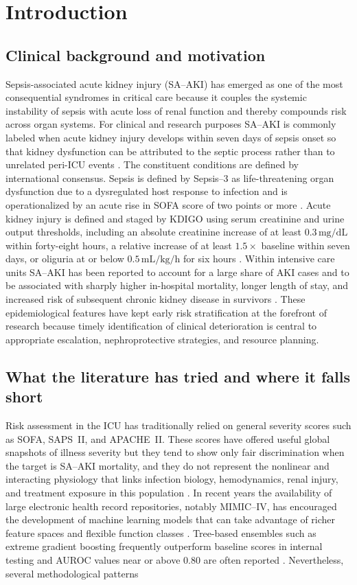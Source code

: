 \chapter{Introduction} \label{chap:intro} \section{Clinical background and motivation} Sepsis-associated acute kidney injury (SA--AKI) has emerged as one of the most consequential syndromes in critical care because it couples the systemic instability of sepsis with acute loss of renal function and thereby compounds risk across organ systems. For clinical and research purposes SA--AKI is commonly labeled when acute kidney injury develops within seven days of sepsis onset so that kidney dysfunction can be attributed to the septic process rather than to unrelated peri-ICU events \citep{Peerapornratana_2019}. The constituent conditions are defined by international consensus. Sepsis is defined by Sepsis--3 as life-threatening organ dysfunction due to a dysregulated host response to infection and is operationalized by an acute rise in SOFA score of two points or more \citep{Singer_2016}. Acute kidney injury is defined and staged by KDIGO using serum creatinine and urine output thresholds, including an absolute creatinine increase of at least $0.3\,\mathrm{mg/dL}$ within forty-eight hours, a relative increase of at least $1.5\times$ baseline within seven days, or oliguria at or below $0.5\,\mathrm{mL/kg/h}$ for six hours \citep{KDIGO_2012}. Within intensive care units SA--AKI has been reported to account for a large share of AKI cases and to be associated with sharply higher in-hospital mortality, longer length of stay, and increased risk of subsequent chronic kidney disease in survivors \citep{Poston_Koyner_2019,Peerapornratana_2019}. These epidemiological features have kept early risk stratification at the forefront of research because timely identification of clinical deterioration is central to appropriate escalation, nephroprotective strategies, and resource planning. \section{What the literature has tried and where it falls short} Risk assessment in the ICU has traditionally relied on general severity scores such as SOFA, SAPS~II, and APACHE~II. These scores have offered useful global snapshots of illness severity but they tend to show only fair discrimination when the target is SA--AKI mortality, and they do not represent the nonlinear and interacting physiology that links infection biology, hemodynamics, renal injury, and treatment exposure in this population \citep{Luo_2022,Qu_2024}. In recent years the availability of large electronic health record repositories, notably MIMIC--IV, has encouraged the development of machine learning models that can take advantage of richer feature spaces and flexible function classes \citep{Johnson_2023_MIMIC}. Tree-based ensembles such as extreme gradient boosting frequently outperform baseline scores in internal testing and AUROC values near or above 0.80 are often reported \citep{Chen_2025,Qu_2024,Wang_2024}. Nevertheless, several methodological patterns 
